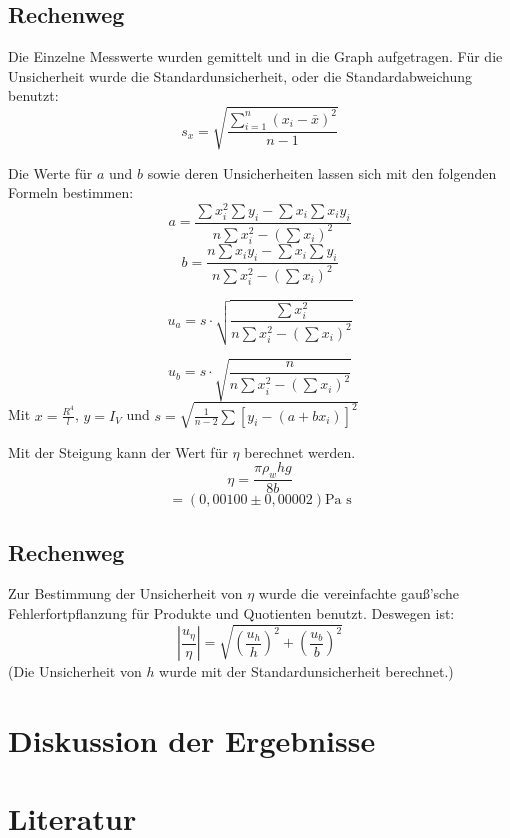 \documentclass[11pt,a4paper]{article}
\begin{document}
\begin{tcolorbox}[colback=white]
	\subsection{Rechenweg}
	Die Einzelne Messwerte wurden gemittelt und in die Graph aufgetragen. Für die Unsicherheit wurde die Standardunsicherheit, oder die Standardabweichung benutzt:
	$$s_x = \sqrt{\frac{\sum_{i=1}^{n}(x_i-\bar{x})^2}{n-1}} $$
	
	Die Werte für $a$ und $b$ sowie deren Unsicherheiten lassen sich mit den folgenden Formeln bestimmen:
	$$a = \frac{
	\sum x_i^2 \sum y_i - \sum x_i \sum x_iy_i
}{
n \sum x_i^2 - (\sum x_i)^2
}$$
$$ b = \frac{
n\sum x_iy_i-\sum x_i \sum y_i
}{
n \sum x_i^2 - (\sum x_i)^2
}$$

$$u_a = s\cdot \sqrt{
\frac{
\sum x_i^2
}{
n\sum x_i^2 - (\sum x_i)^2
}}$$

$$u_b = s\cdot \sqrt{
\frac{
n
}{
n\sum x_i^2 - (\sum x_i)^2
}}$$
Mit $x = \frac{R^4}{l}$, $y = I_V$ und $s = \sqrt{
\frac{1}{n-2}\sum [y_i-(a+bx_i)]^2}$
\end{tcolorbox}

Mit der Steigung kann der Wert für $\eta$ berechnet werden. 
$$\eta = \frac{\pi \rho_w hg}{8b}$$
$$ = (0,00100 \pm 0,00002) \textrm{Pa s} $$

\begin{tcolorbox}[colback=white]
\subsection{Rechenweg}
Zur Bestimmung der Unsicherheit von $\eta$ wurde die vereinfachte gauß'sche Fehlerfortpflanzung für Produkte und Quotienten benutzt. Deswegen ist:
$$\left\vert \frac{u_\eta}{\eta} \right \vert 
= \sqrt{(\frac{u_h}{h})^2+(\frac{u_b}{b})^2} $$
(Die Unsicherheit von $h$ wurde mit der Standardunsicherheit berechnet.)
	
\end{tcolorbox}


\section{Diskussion der Ergebnisse}

\section{Literatur}

	
	
	
	
	
	
	
	
	
	
	
	
\end{document}
